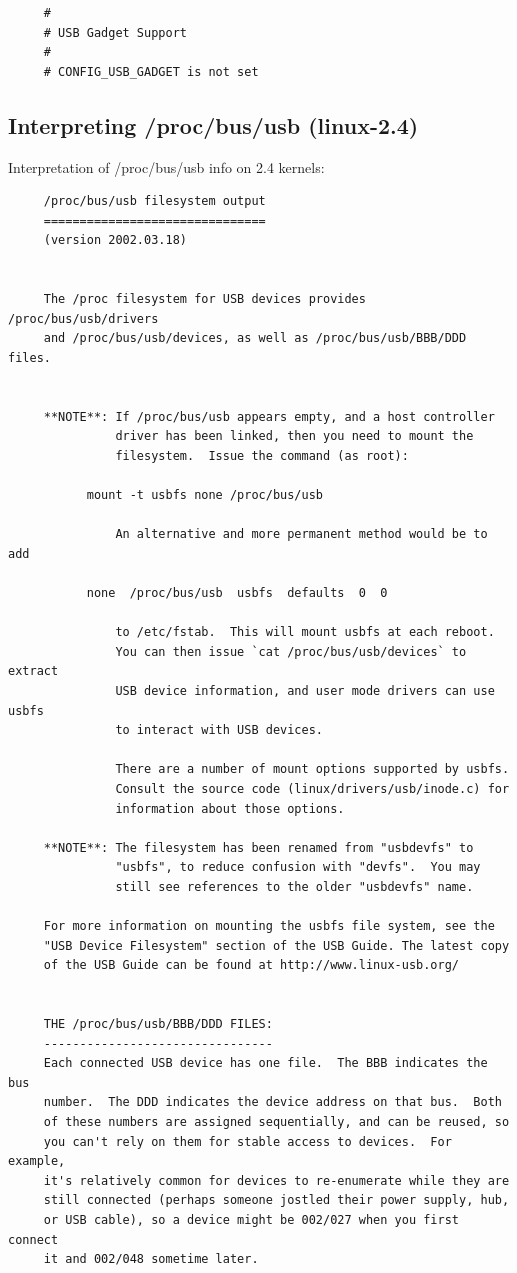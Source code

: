 {{{{{{{{{{{{\begin{verbatim}
     #
     # USB Gadget Support
     #
     # CONFIG_USB_GADGET is not set
\end{verbatim}
\normalsize

\label{proc_usb_info-2.4}
\subsection*{Interpreting /proc/bus/usb (linux-2.4)}
Interpretation of /proc/bus/usb info on 2.4 kernels: 

\footnotesize
\begin{verbatim}
     /proc/bus/usb filesystem output
     ===============================
     (version 2002.03.18)
     
     
     The /proc filesystem for USB devices provides /proc/bus/usb/drivers
     and /proc/bus/usb/devices, as well as /proc/bus/usb/BBB/DDD files.
     
     
     **NOTE**: If /proc/bus/usb appears empty, and a host controller
               driver has been linked, then you need to mount the
               filesystem.  Issue the command (as root):
     
           mount -t usbfs none /proc/bus/usb
     
               An alternative and more permanent method would be to add
     
           none  /proc/bus/usb  usbfs  defaults  0  0
     
               to /etc/fstab.  This will mount usbfs at each reboot.
               You can then issue `cat /proc/bus/usb/devices` to extract
               USB device information, and user mode drivers can use usbfs
               to interact with USB devices.
     
               There are a number of mount options supported by usbfs.
               Consult the source code (linux/drivers/usb/inode.c) for
               information about those options.
     
     **NOTE**: The filesystem has been renamed from "usbdevfs" to
               "usbfs", to reduce confusion with "devfs".  You may
               still see references to the older "usbdevfs" name.
     
     For more information on mounting the usbfs file system, see the
     "USB Device Filesystem" section of the USB Guide. The latest copy
     of the USB Guide can be found at http://www.linux-usb.org/
     
     
     THE /proc/bus/usb/BBB/DDD FILES:
     --------------------------------
     Each connected USB device has one file.  The BBB indicates the bus
     number.  The DDD indicates the device address on that bus.  Both
     of these numbers are assigned sequentially, and can be reused, so
     you can't rely on them for stable access to devices.  For example,
     it's relatively common for devices to re-enumerate while they are
     still connected (perhaps someone jostled their power supply, hub,
     or USB cable), so a device might be 002/027 when you first connect
     it and 002/048 sometime later.
     

\end{verbatim}}}}}}}}}}}}}

